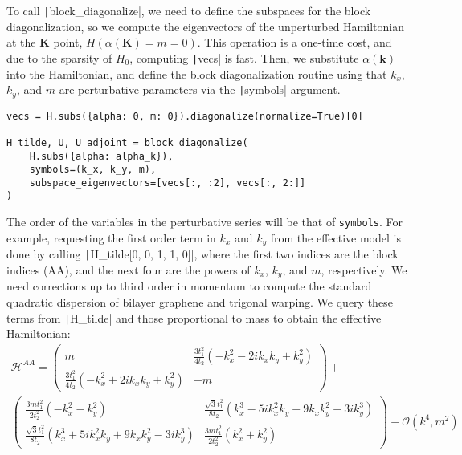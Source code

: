 To call \texttt|block_diagonalize|, we need to define the subspaces
for the block diagonalization, so we compute the eigenvectors of the
unperturbed Hamiltonian at the $\mathbf{K}$ point, $H(\alpha(\mathbf{K}) = m =
0)$.
This operation is a one-time cost, and due to the sparsity of $H_0$, computing
\texttt|vecs| is fast.
Then, we substitute $\alpha(\mathbf{k})$ into the Hamiltonian, and define the
block diagonalization routine using that $k_x$, $k_y$, and $m$ are perturbative
parameters via the \texttt|symbols| argument.
%
\begin{verbatim}
vecs = H.subs({alpha: 0, m: 0}).diagonalize(normalize=True)[0]

H_tilde, U, U_adjoint = block_diagonalize(
    H.subs({alpha: alpha_k}),
    symbols=(k_x, k_y, m),
    subspace_eigenvectors=[vecs[:, :2], vecs[:, 2:]]
)
\end{verbatim}
%
The order of the variables in the perturbative series will be that of
\texttt{symbols}.
For example, requesting the first order term in $k_x$ and $k_y$ from the
effective model is done by calling \texttt|H_tilde[0, 0, 1, 1, 0]|,
where the first two indices are the block indices (AA), and the next four are
the powers of $k_x$, $k_y$, and $m$, respectively.
We need corrections up to third order in momentum to compute the standard
quadratic dispersion of bilayer graphene and trigonal warping.
We query these terms from \texttt|H_tilde| and those proportional
to mass to obtain the effective Hamiltonian:
%
{\small
\begin{gather}
\mathcal{H}^{AA} =
\begin{pmatrix}
m & \frac{3 t_1^2}{4 t_2} ( - k_x^2 - 2ik_x k_y + k_y^2) \\
\frac{3 t_1^2}{4 t_2} ( - k_x^2 + 2ik_x k_y + k_y^2) & -m
\end{pmatrix} + \nonumber \\
\begin{pmatrix}
\frac{3 m t_1^2}{2 t_2^2} ( - k_x^2 - k_y^2) & \frac{\sqrt{3} t_1^2}{8 t_2} (k_x^3 - 5ik_x^2 k_y + 9 k_x k_y^2 + 3ik_y^3) \\
\frac{\sqrt{3} t_1^2}{8 t_2} (k_x^3 + 5ik_x^2 k_y + 9 k_x k_y^2 - 3ik_y^3) & \frac{3 m t_1^2}{2 t_2^2} (k_x^2 + k_y^2)
\end{pmatrix} \nonumber
+
\mathcal{O}(k^4, m^2)
\end{gather}
}
%
